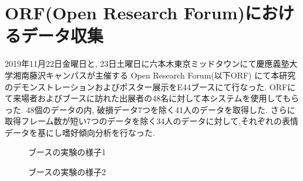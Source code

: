 \section{ORF(Open Research Forum)におけるデータ収集}
2019年11月22日金曜日と, 23日土曜日に六本木東京ミッドタウンにて慶應義塾大学湘南藤沢キャンパスが主催する
Open Research Forum(以下ORF) にて本研究のデモンストレーションおよびポスター展示をE44ブースにて行なった.
ORFにて来場者およびブースに訪れた出展者の48名に対して本システムを使用してもらった.
48個のデータの内, 破損データ7つを除く41人のデータを取得した.
さらに取得フレーム数が短い7つのデータを除く34人のデータに対して,それぞれの表情データを基にし嗜好傾向分析を行なった.

\begin{figure}[htbp]
    \begin{center}
    \end{center}
    \caption{ブースの実験の様子1}
    \label{fig:20191122}
\end{figure}

\begin{figure}[htbp]
    \begin{center}
    \end{center}
    \caption{ブースの実験の様子2}
    \label{fig:20191123}
\end{figure}

